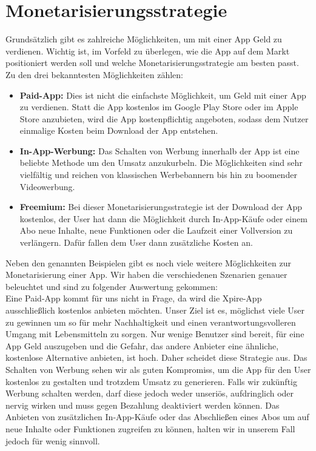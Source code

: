 \section{Monetarisierungsstrategie}
Grundsätzlich gibt es zahlreiche Möglichkeiten, um mit einer App Geld zu verdienen. Wichtig ist, im Vorfeld zu überlegen, wie die App auf dem Markt positioniert werden soll und welche Monetarisierungsstrategie am besten passt. Zu den drei bekanntesten Möglichkeiten zählen:
\begin{itemize}[noitemsep]
	\item \textbf{Paid-App:} Dies ist nicht die einfachste Möglichkeit, um Geld mit einer App zu verdienen. Statt die App kostenlos im Google Play Store oder im Apple Store anzubieten, wird die App kostenpflichtig angeboten, sodass dem Nutzer einmalige Kosten beim Download der App entstehen.
	\item \textbf{In-App-Werbung:} Das Schalten von Werbung innerhalb der App ist eine beliebte Methode um den Umsatz anzukurbeln. Die Möglichkeiten sind sehr vielfältig und reichen von klassischen Werbebannern bis hin zu boomender Videowerbung.
	\item \textbf{Freemium:} Bei dieser Monetarisierungsstrategie ist der Download der App kostenlos, der User hat dann die Möglichkeit durch In-App-Käufe oder einem Abo neue Inhalte, neue Funktionen oder die Laufzeit einer Vollversion zu verlängern. Dafür fallen dem User dann zusätzliche Kosten an.
\end{itemize}
Neben den genannten Beispielen gibt es noch viele weitere Möglichkeiten zur Monetarisierung einer App. Wir haben die verschiedenen Szenarien genauer beleuchtet und sind zu folgender Auswertung gekommen:\\
Eine Paid-App kommt für uns nicht in Frage, da wird die Xpire-App ausschließlich kostenlos anbieten möchten. Unser Ziel ist es, möglichst viele User zu gewinnen um so für mehr Nachhaltigkeit und einen verantwortungsvolleren Umgang mit Lebensmitteln zu sorgen. Nur wenige Benutzer sind bereit, für eine App Geld auszugeben und die Gefahr, das andere Anbieter eine ähnliche, kostenlose Alternative anbieten, ist hoch. Daher scheidet diese Strategie aus.
Das Schalten von Werbung sehen wir als guten Kompromiss, um die App für den User kostenlos zu gestalten und trotzdem Umsatz zu generieren. Falls wir zukünftig Werbung schalten werden, darf diese jedoch weder unseriös, aufdringlich oder nervig wirken und muss gegen Bezahlung deaktiviert werden können.
Das Anbieten von zusätzlichen In-App-Käufe oder das Abschließen eines Abos um auf neue Inhalte oder Funktionen zugreifen zu können, halten wir in unserem Fall jedoch für wenig sinnvoll.\\
